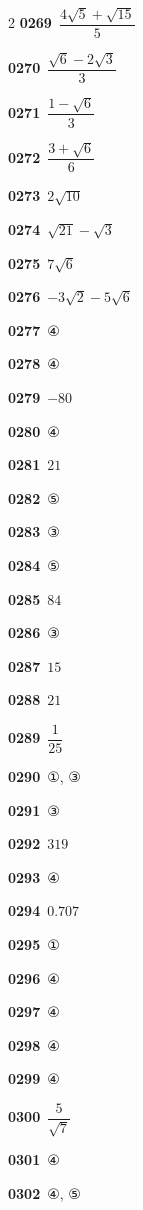 \documentclass[10pt,a4paper]{article}
\begin{document}
\begin{multicols}{2}
\noindent\textbf{0269}\ $\dfrac{4\sqrt{5}+\sqrt{15}}{5}$\par
\noindent\textbf{0270}\ $\dfrac{\sqrt{6}-2\sqrt{3}}{3}$\par
\noindent\textbf{0271}\ $\dfrac{1-\sqrt{6}}{3}$\par
\noindent\textbf{0272}\ $\dfrac{3+\sqrt{6}}{6}$\par
\noindent\textbf{0273}\ $2\sqrt{10}$\par
\noindent\textbf{0274}\ $\sqrt{21}-\sqrt{3}$\par
\noindent\textbf{0275}\ $7\sqrt{6}$\par
\noindent\textbf{0276}\ $-3\sqrt{2}-5\sqrt{6}$\par
\noindent\textbf{0277}\ ④\par
\noindent\textbf{0278}\ ④\par
\noindent\textbf{0279}\ $-80$\par
\noindent\textbf{0280}\ ④\par
\noindent\textbf{0281}\ $21$\par
\noindent\textbf{0282}\ ⑤\par
\noindent\textbf{0283}\ ③\par
\noindent\textbf{0284}\ ⑤\par
\noindent\textbf{0285}\ $84$\par
\noindent\textbf{0286}\ ③\par
\noindent\textbf{0287}\ $15$\par
\noindent\textbf{0288}\ $21$\par
\noindent\textbf{0289}\ $\dfrac{1}{25}$\par
\noindent\textbf{0290}\ ①, ③\par
\noindent\textbf{0291}\ ③\par
\noindent\textbf{0292}\ $319$\par
\noindent\textbf{0293}\ ④\par
\noindent\textbf{0294}\ $0.707$\par
\noindent\textbf{0295}\ ①\par
\noindent\textbf{0296}\ ④\par
\noindent\textbf{0297}\ ④\par
\noindent\textbf{0298}\ ④\par
\noindent\textbf{0299}\ ④\par
\noindent\textbf{0300}\ $\dfrac{5}{\sqrt{7}}$\par
\noindent\textbf{0301}\ ④\par
\noindent\textbf{0302}\ ④, ⑤\par

\end{multicols}
\end{document}
